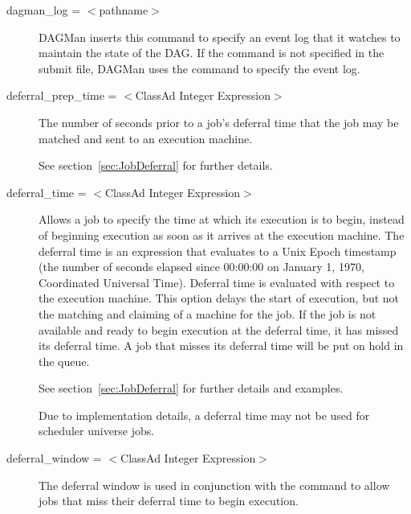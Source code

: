 \begin{description}
\label{condor-submit-dagman-log}
\item[dagman\_log = $<$pathname$>$] 
DAGMan inserts this command to specify an event log that it watches to maintain
the state of the DAG. If the  command is not specified in the
submit file, DAGMan uses the  command to specify the event log.


\label{condor-submit-deferral-prep-time}
\item[deferral\_prep\_time = $<$ClassAd Integer Expression$>$]
The number of seconds prior to a job's deferral time that
the job may be matched and sent to an execution machine.

See section~\ref{sec:JobDeferral} for further details.


\label{condor-submit-deferral-time}
\item[deferral\_time = $<$ClassAd Integer Expression$>$]
Allows a job to specify the time at which its execution
is to begin,
instead of beginning execution as soon as it arrives at the execution
machine. The deferral time is an expression that 
evaluates to a Unix Epoch timestamp (the number of
seconds elapsed since 00:00:00 on January 1, 1970, Coordinated
Universal Time). 
Deferral time is evaluated with respect to the execution machine.
This option delays the start of
execution, but not the matching and claiming of
a machine for the job.
If the job is not available and ready to begin
execution at the deferral time, it has missed its deferral time.
A job that misses its deferral time will be put on hold
in the queue. 

See section~\ref{sec:JobDeferral} for further details and examples.

Due to implementation details,
a deferral time may not be used for scheduler universe jobs.


\label{condor-submit-deferral-window}
\item[deferral\_window = $<$ClassAd Integer Expression$>$]
The deferral window is used in conjunction with the
 command to allow jobs that
miss their deferral time to begin execution.


\end{description}

